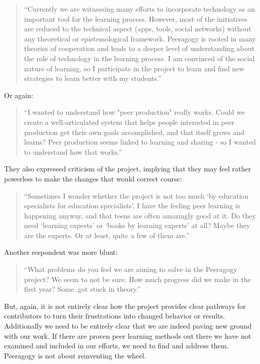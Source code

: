 \documentclass{acm_proc_article-sp}
\begin{document}
\begin{quote}
``Currently we are witnessing many efforts to incorporate technology as
an important tool for the learning process. However, most of the
initiatives are reduced to the technical aspect (apps, tools, social
networks) without any theoretical or epistemological
framework. Peeragogy is rooted in many theories of cooperation and
leads to a deeper level of understanding about the role of technology
in the learning process. I am convinced of the social nature of
learning, so I participate in the project to learn and find new
strategies to learn better with my students.''
\end{quote}

Or again:

\begin{quote}
``I wanted to understand how "peer production" really works. Could we
create a well-articulated system that helps people interested in peer
production get their own goals accomplished, and that itself grows and
learns? Peer production seems linked to learning and sharing - so I
wanted to understand how that works.''
\end{quote}

They also expressed criticism of the project, implying that they may feel rather powerless to make the changes that would correct course:

\begin{quote}
``Sometimes I wonder whether the project is not too much `by education specialists for education specialists'. I have the feeling peer learning is happening anyway, and that teens are often amazingly good at it. Do they need `learning experts' or `books by learning experts' at all? Maybe they are the experts. Or at least, quite a few of them are.''
\end{quote}

Another respondent was more blunt:

\begin{quote}
``What problems do you feel we are aiming to solve in the Peeragogy
project? We seem to not be sure. How much progress did we make in the
first year? Some..got stuck in theory.''
\end{quote}

But, again, it is not entirely clear how the project provides clear pathways for contributors to turn their frustrations into changed behavior or results. Additionally we need to be entirely clear that we are indeed paving new ground with our work. If there are proven peer learning methods out there we have not examined and included in our efforts, we need to find and address them. Peeragogy is not about reinventing the wheel.
\end{document}
